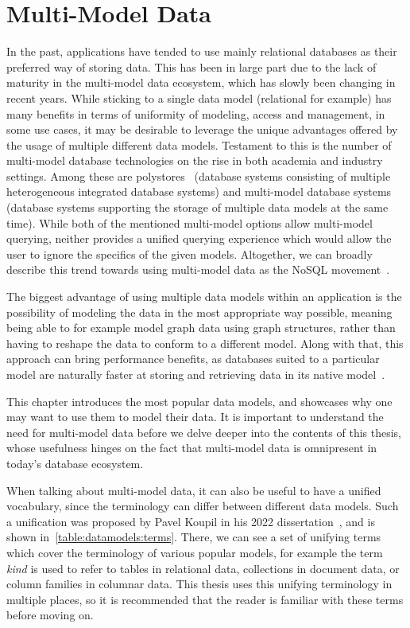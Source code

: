\chapter{Multi-Model Data}
\label{multimodel}

In the past, applications have tended to use mainly relational databases as their preferred way of storing data.
This has been in large part due to the lack of maturity in the multi-model data ecosystem, which has slowly been changing in recent years.
While sticking to a single data model (relational for example) has many benefits in terms of uniformity of modeling, access and management, in some use cases, it may be desirable to leverage the unique advantages offered by the usage of multiple different data models.
Testament to this is the number of multi-model database technologies on the rise in both academia and industry settings.
Among these are polystores~\cite{polystores}\cite{polystores2} (database systems consisting of multiple heterogeneous integrated database systems) and multi-model database systems~\cite{multimodel_dbs}\cite{multimodel_dbs2} (database systems supporting the storage of multiple data models at the same time).
While both of the mentioned multi-model options allow multi-model querying, neither provides a unified querying experience which would allow the user to ignore the specifics of the given models.
Altogether, we can broadly describe this trend towards using multi-model data as the NoSQL movement~\cite{nosql}.

The biggest advantage of using multiple data models within an application is the possibility of modeling the data in the most appropriate way possible, meaning being able to for example model graph data using graph structures, rather than having to reshape the data to conform to a different model.
Along with that, this approach can bring performance benefits, as databases suited to a particular model are naturally faster at storing and retrieving data in its native model~\cite{unibench}.

This chapter introduces the most popular data models, and showcases why one may want to use them to model their data.
It is important to understand the need for multi-model data before we delve deeper into the contents of this thesis, whose usefulness hinges on the fact that multi-model data is omnipresent in today's database ecosystem.

When talking about multi-model data, it can also be useful to have a unified vocabulary, since the terminology can differ between different data models.
Such a unification was proposed by Pavel Koupil in his 2022 dissertation~\cite{koupil_thesis}, and is shown in~\cref{table:datamodels:terms}.
There, we can see a set of unifying terms which cover the terminology of various popular models, for example the term \textit{kind} is used to refer to tables in relational data, collections in document data, or column families in columnar data.
This thesis uses this unifying terminology in multiple places, so it is recommended that the reader is familiar with these terms before moving on.

